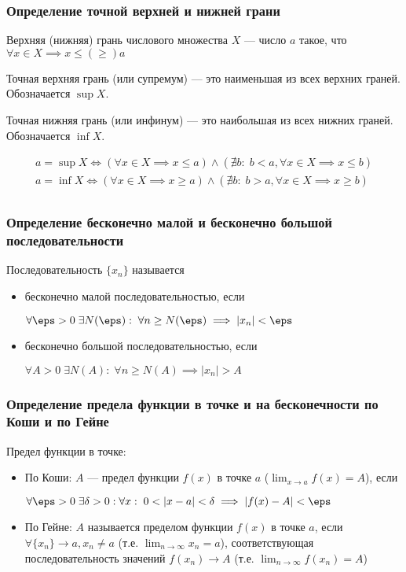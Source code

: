 \documentclass[12pt, a4paper]{article}
\begin{document}
	\subsubsection{Определение точной верхней и нижней грани}
	Верхняя (нижняя) грань числового множества $X$ --- число $a$ такое, что $\forall x \in X \implies x \leq (\geq) a$

	Точная верхняя грань (или супремум) ---	это наименьшая из всех верхних граней. Обозначается $\sup X$.

	Точная нижняя грань (или инфинум) --- это наибольшая из всех нижних граней. Обозначается $\inf X$.

	\[\begin{gathered}
		a = \sup X \iff (\forall x \in X \implies x \leq a) \land (\nexists b: \;b < a, \forall x \in X \implies x \leq b) \\
		a = \inf X \iff (\forall x \in X \implies x \geq a) \land (\nexists b: \;b > a, \forall x \in X \implies x \geq b) \\
	\end{gathered}\]

	\subsubsection{Определение бесконечно малой и бесконечно большой последовательности}
	Последовательность $\{x_n\}$ называется 
	\begin{itemize}
		\item
		бесконечно малой последовательностью, если 

		$\forall \eps > 0 \; \exists N(\eps): \; \forall n \geq N(\eps) \implies |x_n| < \eps$

		\item
		бесконечно большой последовательностью, если 

		$\forall A > 0 \; \exists N(A): \; \forall n \geq N(A) \implies |x_n| > A$
	\end{itemize}

	\subsubsection{Определение предела функции в точке и на бесконечности по Коши и по Гейне}
	Предел функции в точке:
	\begin{itemize}
		\item
		По Коши: $A$ --- предел функции $f(x)$ в точке $a$ ($\lim_{x \to a} f(x) = A$), если 

		$\forall \eps > 0 \; \exists \delta > 0: \forall x: \; 0 < |x - a| < \delta \implies |f(x) - A| < \eps$

		\item
		По Гейне: $A$ называется пределом функции $f(x)$ в точке $a$, если $\forall \{x_n\} \to a, x_n \neq a$ (т.е. $\lim_{n \to \infty} x_n = a$), соответствующая последовательность значений $f(x_n) \to A$ (т.е. $\lim_{n \to \infty} f(x_n) = A$)
	\end{itemize}
\end{document}

